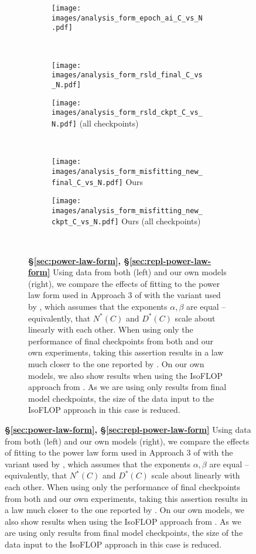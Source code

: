 \begin{figure}[!htp]
\centering
\begin{subfigure}{\textwidth}
    \centering
\begin{subfigure}{0.49\textwidth}
    \texttt{[image: images/analysis\_form\_epoch\_ai\_C\_vs\_N.pdf]}  \footnotesize{\citet{hoffmann2022training,besiroglu2024chinchilla}}
\end{subfigure}
\\ \vspace{1em}
\centering
\begin{subfigure}{0.49\textwidth}
    \centering
    \texttt{[image: images/analysis\_form\_rsld\_final\_C\_vs\_N.pdf]}
    \footnotesize{\citet{porian2024resolving}}
\end{subfigure}
\hfill
\begin{subfigure}{0.49\textwidth}
    \centering
    \texttt{[image: images/analysis\_form\_rsld\_ckpt\_C\_vs\_N.pdf]}
    \footnotesize{\citet{porian2024resolving} (all checkpoints)}
\end{subfigure}
\\ \vspace{1em}
\centering
\begin{subfigure}{0.49\textwidth}
    \centering
    \texttt{[image: images/analysis\_form\_misfitting\_new\_final\_C\_vs\_N.pdf]}
    \footnotesize{Ours}
\end{subfigure}
    \hfill
\begin{subfigure}{0.49\textwidth}
    \centering
    \texttt{[image: images/analysis\_form\_misfitting\_new\_ckpt\_C\_vs\_N.pdf]}
    \footnotesize{Ours (all checkpoints)}
\end{subfigure}
\\ \vspace{1em}
\caption{\textbf{\S\ref{sec:power-law-form}, \S\ref{sec:repl-power-law-form}} Using data from both \citet{besiroglu2024chinchilla} (left) and our own models (right), we compare the effects of fitting to the power law form used in Approach 3 of \citet{hoffmann2022training} with the variant used by \citet{muennighoff2024scaling}, which assumes that the exponents $\alpha, \beta$ are equal -- equivalently, that $N^*(C)$ and $D^*(C)$ scale about linearly with each other.  When using only the performance of final checkpoints from both \citet{besiroglu2024chinchilla} and our own experiments, taking this assertion results in a law much closer to the one reported by \citet{hoffmann2022training}. On our own models, we also show results when using the IsoFLOP approach from \citet{hoffmann2022training}. As we are using only results from final model checkpoints, the size of the data input to the IsoFLOP approach in this case is reduced.}
\label{fig:analysis_form_app}
\end{subfigure}
\end{figure}

